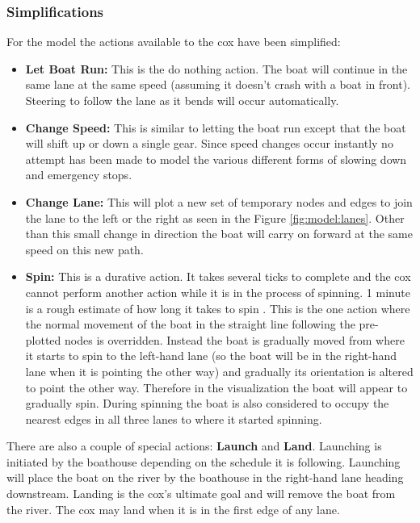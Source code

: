       \subsubsection{Simplifications}
      For the model the actions available to the cox have been simplified:
      \begin{itemize}
        \item{\textbf{Let Boat Run:}} This is the do nothing action. The boat will continue in the same lane at the same speed (assuming it doesn't crash with a boat in front). Steering to follow the lane as it bends will occur automatically.
        \item{\textbf{Change Speed:}} This is similar to letting the boat run except that the boat will shift up or down a single gear. Since speed changes occur instantly no attempt has been made to model the various different forms of slowing down and emergency stops.
        \item{\textbf{Change Lane:}} This will plot a new set of temporary nodes and edges to join the lane to the left or the right as seen in the Figure \ref{fig:model:lanes}. Other than this small change in direction the boat will carry on forward at the same speed on this new path.
        \item{\textbf{Spin:}} This is a durative action. It takes several ticks to complete and the cox cannot perform another action while it is in the process of spinning. 1 minute is a rough estimate of how long it takes to spin \cite{QCBC}. This is the one action where the normal movement of the boat in the straight line following the pre-plotted nodes  is overridden. Instead the boat is gradually moved from where it starts to spin to the left-hand lane (so the boat will be in the right-hand lane when it is pointing the other way) and gradually its orientation is altered to point the other way. Therefore in the visualization the boat will appear to gradually spin. During spinning the boat is also considered to occupy the nearest edges in all three lanes to where it started spinning.
      \end{itemize}
      
      There are also a couple of special actions: \textbf{Launch} and \textbf{Land}. Launching is initiated by the boathouse depending on the schedule it is following. Launching will place the boat on the river by the boathouse in the right-hand lane heading downstream. Landing is the cox's ultimate goal and will remove the boat from the river. The cox may land when it is in the first edge of any lane.
      

